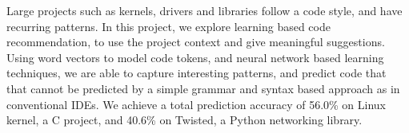Large projects such as kernels, drivers and libraries follow a code
style, and have recurring patterns. In this project, we explore learning based
code recommendation, to use the project context and give meaningful
suggestions.
Using word vectors to model code tokens, and neural network based learning
techniques, we are able to capture interesting patterns, and predict code that
that cannot be predicted by a simple grammar and syntax based approach as in
conventional IDEs.
We achieve a total prediction accuracy of 56.0\% on Linux
kernel, a C project, and 40.6\% on Twisted, a Python
networking library.
